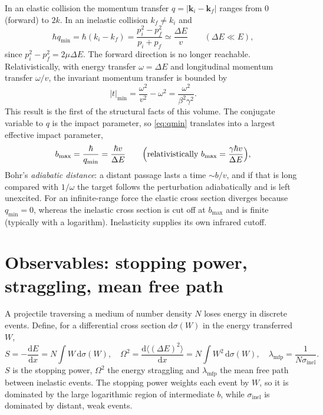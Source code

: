 \documentclass[11pt,a4paper]{book}
\numberwithin{equation}{chapter}
\newcommand{\dd}{\mathrm{d}}
\newcommand{\vk}{\bm{k}}
\begin{document}
In an elastic collision the momentum transfer $q=|\vk_i-\vk_f|$ ranges from $0$
(forward) to $2k$. In an inelastic collision $k_f\ne k_i$ and
\begin{equation}\label{eq:qmin}
  \hbar q_{\min}=\hbar(k_i-k_f)=\frac{p_i^2-p_f^2}{p_i+p_f}
  \simeq\frac{\Delta E}{v}\qquad(\Delta E\ll E),
\end{equation}
since $p_i^2-p_f^2=2\mu\Delta E$. The forward direction is no longer reachable.
Relativistically, with energy transfer $\omega=\Delta E$ and longitudinal
momentum transfer $\omega/v$, the invariant momentum transfer is bounded by
\begin{equation}\label{eq:tmin}
  |t|_{\min}=\frac{\omega^2}{v^2}-\omega^2=\frac{\omega^2}{\beta^2\gamma^2}.
\end{equation}
This result is the first of the structural facts of this volume. The conjugate
variable to $q$ is the impact parameter, so \eqref{eq:qmin} translates into a
largest effective impact parameter,
\begin{equation}\label{eq:bmax}
  b_{\max}=\frac{\hbar}{q_{\min}}=\frac{\hbar v}{\Delta E}\qquad
  \Bigl(\text{relativistically }b_{\max}=\frac{\gamma\hbar v}{\Delta E}\Bigr),
\end{equation}
Bohr's \emph{adiabatic distance}: a distant passage lasts a time $\sim b/v$, and
if that is long compared with $1/\omega$ the target follows the perturbation
adiabatically and is left unexcited. For an infinite-range force the elastic
cross section diverges because $q_{\min}=0$, whereas the inelastic cross section
is cut off at $b_{\max}$ and is finite (typically with a logarithm). Inelasticity
supplies its own infrared cutoff.

\section{Observables: stopping power, straggling, mean free path}

A projectile traversing a medium of number density $N$ loses energy in discrete
events. Define, for a differential cross section $\dd\sigma(W)$ in the energy
transferred $W$,
\begin{equation}\label{eq:S-def}
  S=-\frac{\dd E}{\dd x}=N\!\int W\,\dd\sigma(W),\quad
  \Omega^2=\frac{\dd\langle(\Delta E)^2\rangle}{\dd x}=N\!\int W^2\,\dd\sigma(W),\quad
  \lambda_{\mathrm{mfp}}=\frac1{N\sigma_{\mathrm{inel}}}.
\end{equation}
$S$ is the stopping power, $\Omega^2$ the energy straggling and
$\lambda_{\mathrm{mfp}}$ the mean free path between inelastic events. The
stopping power weights each event by $W$, so it is dominated by the large
logarithmic region of intermediate $b$, while $\sigma_{\mathrm{inel}}$ is
dominated by distant, weak events.
\end{document}
